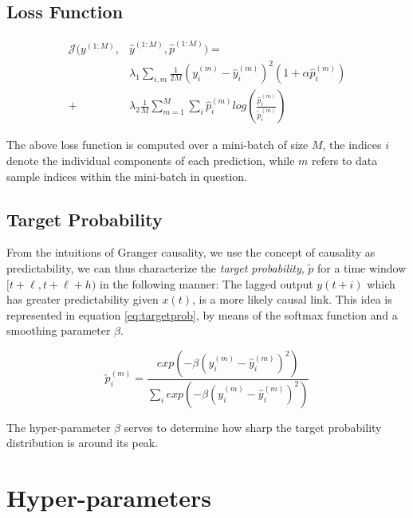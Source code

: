 \documentclass[envcountsect,runningheads]{llncs}
\theoremstyle{etoile}
\begin{document}
\subsection{Loss Function}

\begin{equation}\label{eq:loss}
\begin{aligned}
\mathcal{J}(y^{(1:M)}, &\hat{y}^{(1:M)}, \hat{p}^{(1:M)}) =\\ 
&\lambda_1 \sum_{i,m}{\frac{1}{2M} (y^{(m)}_{i} - \hat{y}^{(m)}_{i})^2 (1 + \alpha \hat{p}^{(m)}_i)} \\ 
+ &\lambda_2 \frac{1}{M} \sum_{m = 1}^{M}{\sum_{i}{\hat{p}^{(m)}_{i}log \left (\frac{\hat{p}^{(m)}_i}{\tilde{p}^{(m)}_i} \right)}}
\end{aligned}
\end{equation}
      

The above loss function is computed over a mini-batch of size $M$, the indices $i$ denote the
individual components of each prediction, while $m$ refers to data sample indices within the
mini-batch in question.


\subsection{Target Probability}\label{sec:targetprob}

From the intuitions of Granger causality, we use the concept of causality as predictability, 
we can thus characterize the \emph{target probability}, $\widetilde{p}$ for a time window 
$[t+\ell, t+\ell+h)$ in the following manner: The lagged output $y(t+i)$ which has greater 
predictability given $x(t)$, is a more likely causal link. This idea is represented in 
equation \ref{eq:targetprob}, by means of the softmax function and a smoothing parameter 
$\beta$.

\begin{equation}\label{eq:targetprob}
\widetilde{p}_{i}^{(m)} = \frac{exp \left(- \beta (y_{i}^{(m)} - \hat{y}_{i}^{(m)})^{2} \right)}
{\sum_{i}{exp \left(- \beta (y_{i}^{(m)} - \hat{y}_{i}^{(m)})^{2} \right)}} 
\end{equation}

The hyper-parameter $\beta$ serves to determine how sharp the target probability distribution is 
around its peak.


\section{Hyper-parameters}
\end{document}
